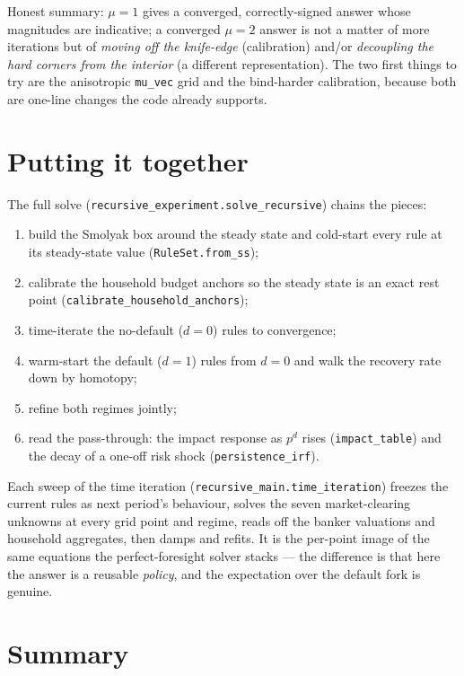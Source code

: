 \documentclass[11pt]{article}
\newcommand{\code}[1]{\texttt{#1}}
\begin{document}
\noindent Honest summary: $\mu=1$ gives a converged, correctly-signed answer
whose magnitudes are indicative; a converged $\mu=2$ answer is not a matter of
more iterations but of \emph{moving off the knife-edge} (calibration) and/or
\emph{decoupling the hard corners from the interior} (a different
representation). The two first things to try are the anisotropic
\code{mu\_vec} grid and the bind-harder calibration, because both are
one-line changes the code already supports.


\section{Putting it together}
\label{sec:together}

The full solve (\code{recursive\_experiment.solve\_recursive}) chains the
pieces:
\begin{enumerate}
\item build the Smolyak box around the steady state and cold-start every rule
      at its steady-state value (\code{RuleSet.from\_ss});
\item calibrate the household budget anchors so the steady state is an exact
      rest point (\code{calibrate\_household\_anchors});
\item time-iterate the no-default ($d=0$) rules to convergence;
\item warm-start the default ($d=1$) rules from $d=0$ and walk the recovery
      rate down by homotopy;
\item refine both regimes jointly;
\item read the pass-through: the impact response as $p^d$ rises
      (\code{impact\_table}) and the decay of a one-off risk shock
      (\code{persistence\_irf}).
\end{enumerate}
Each sweep of the time iteration (\code{recursive\_main.time\_iteration})
freezes the current rules as next period's behaviour, solves the seven
market-clearing unknowns at every grid point and regime, reads off the
banker valuations and household aggregates, then damps and refits. It is the
per-point image of the same equations the perfect-foresight solver stacks ---
the difference is that here the answer is a reusable \emph{policy}, and the
expectation over the default fork is genuine.


\section*{Summary}
\end{document}
